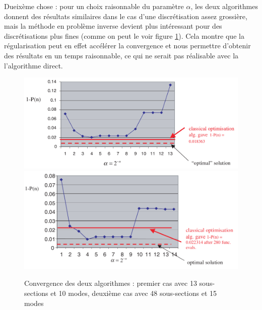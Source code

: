 \documentclass{article}
\begin{document}
Dueixème chose : pour un choix raisonnable du paramètre $\alpha$, les deux algorithmes donnent des résultats similaires dans le cas d'une discrétisation assez grossière, mais la méthode en problème inverse devient plus intéressant pour des discrétisations plus fines (comme on peut le voir figure \ref{fig:accConv}). Cela montre que la régularisation peut en effet accélérer la convergence et nous permettre d'obtenir des résultats en un temps raisonnable, ce qui ne serait pas réalisable avec la l'algorithme direct. 
\begin{figure}[!h]
	\centering
	\includegraphics[scale=0.35]{images/convAlgo13.png}
	\includegraphics[scale=0.35]{images/convAlgo48.png}
	\caption{Convergence des deux algorithmes : premier cas avec 13 sous-sections et 10 modes, deuxième cas avec 48 sous-sections et 15 modes}
	\label{fig:accConv}
\end{figure}
\end{document}
